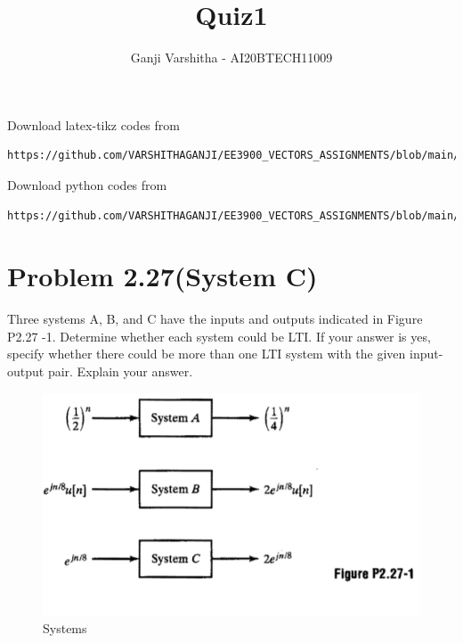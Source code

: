\documentclass[journal,12pt,twocolumn]{IEEEtran}
\begin{document}
\let\vec\mathbf
\vspace{3cm}
\title{Quiz1}
\author{Ganji Varshitha - AI20BTECH11009}
\maketitle
\newpage
\bigskip
\renewcommand{\thetable}{\theenumi}
Download latex-tikz codes from 
%
\begin{lstlisting}
https://github.com/VARSHITHAGANJI/EE3900_VECTORS_ASSIGNMENTS/blob/main/QUIZ1/QUIZ1.tex
\end{lstlisting}
%
Download python codes from 
%
\begin{lstlisting}
https://github.com/VARSHITHAGANJI/EE3900_VECTORS_ASSIGNMENTS/blob/main/QUIZ1/codes.py
\end{lstlisting}
\section*{Problem 2.27(System C)}
Three systems A, B, and C have the inputs and outputs indicated in Figure P2.27 -1. Determine whether each system could be LTI. If your answer is yes, specify whether there could
be more than one LTI system with the given input-output pair. Explain your answer.
\begin{figure}[!htp]
    \centering
    \includegraphics[width = \columnwidth]{quiz_1}
    \caption{Systems}
    \label{f0}
\end{figure} 
\end{document}

